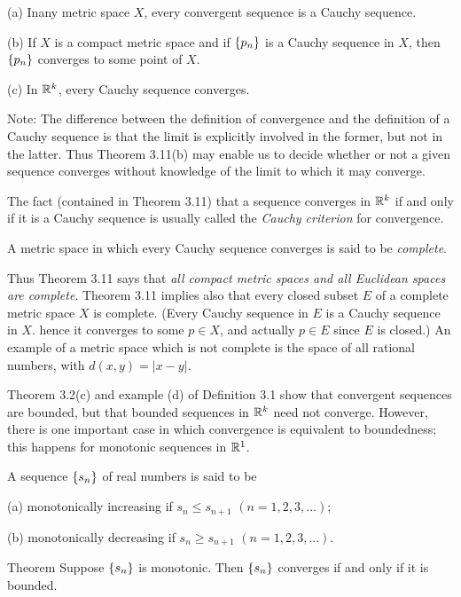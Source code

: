 \begin{thm}\label{thm:3.11}
    (a) Inany metric space $X$, every convergent sequence is a Cauchy sequence.

    (b) If $X$ is a compact metric space and if $\protect\{p_n\}$ is a Cauchy sequence in $X$, then $\protect\{p_n\}$ converges to some point of $X$.

    (c) In ${\protect\mathbb R}^{k}$, every Cauchy sequence converges.
\end{thm}

Note: The difference between the definition of convergence and
the definition of a Cauchy sequence is that the limit is explicitly involved
in the former, but not in the latter. Thus Theorem 3.11(b) may enable us
to decide whether or not a given sequence converges without knowledge
of the limit to which it may converge.

The fact (contained in Theorem 3.11) that a sequence converges in
${\protect\mathbb R}^{k}$ if and only if it is a Cauchy sequence is usually called the 
\emph{Cauchy criterion} for convergence.

\begin{myDef}\label{myDef:3.12}
    A metric space in which every Cauchy sequence converges is
    said to be \emph{complete}.
\end{myDef}


Thus Theorem 3.11 says that \emph{all compact metric spaces and all Euclidean spaces are complete}. Theorem 3.11 implies also that every closed subset $E$ of a complete metric space $X$ is complete. (Every Cauchy sequence in $E$ is a Cauchy sequence in $X$. hence it converges to some $p \in X$, and actually $p \in E$ since $E$ is closed.) An example of a metric space which is not complete is the space of all
rational numbers, with $d(x, y) = |x - y|$.

Theorem 3.2(c) and example (d) of Definition 3.1 show that convergent sequences are bounded, but that bounded sequences in ${\protect\mathbb R}^{k}$ need not converge. However, there is one important case in which convergence is equivalent to boundedness; this happens for monotonic sequences in ${\protect\mathbb R}^{1}$.


\begin{myDef}\label{myDef:3.13}
    A sequence $\protect\{s_n\}$ of real numbers is said to be

    (a) monotonically increasing if $s_n \leq s_{n+1}$ $(n=1,2,3,...)$;

    (b) monotonically decreasing if $s_n \geq s_{n+1}$ $(n=1,2,3,...)$.
\end{myDef}

\begin{thm}\label{thm:3.14}
    Theorem Suppose $\protect\{s_n\}$ is monotonic. Then $\protect\{s_n\}$ converges if and only if it is bounded.
\end{thm}
